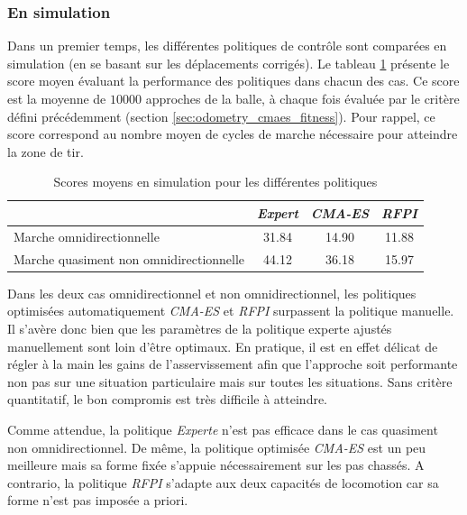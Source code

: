 \subsubsection{En simulation}

Dans un premier temps, les différentes politiques de contrôle
sont comparées en simulation (en se basant sur les déplacements corrigés).
Le tableau \ref{tab:odometry_cmaes_results_sim} présente 
le score moyen évaluant la performance des politiques dans chacun des cas.
Ce score est la moyenne de $10000$ approches
de la balle, à chaque fois évaluée par le critère défini précédemment 
(section \ref{sec:odometry_cmaes_fitness}).
Pour rappel, ce score correspond au nombre moyen de cycles de marche
nécessaire pour atteindre la zone de tir.\\

\begin{table}[h]
    \caption{
        \label{tab:odometry_cmaes_results_sim}Scores moyens 
        en simulation pour les différentes politiques}
    \centering
    \begin{tabular}{|l|c|c|c|}
        \hline
            & \textit{Expert} & \textit{CMA-ES} & \textit{RFPI} \\
        \hline
        Marche omnidirectionnelle     & 31.84      & 14.90  & 11.88      \\
        Marche quasiment non omnidirectionnelle   & 44.12      & 36.18  & 15.97 \\
        \hline
    \end{tabular}
\end{table}

Dans les deux cas omnidirectionnel et non omnidirectionnel, les politiques 
optimisées automatiquement \textit{CMA-ES} et \textit{RFPI} surpassent 
la politique manuelle.
Il s'avère donc bien que les paramètres de la politique experte 
ajustés manuellement sont loin d'être optimaux.
En pratique, il est en effet délicat de régler à la main les gains de l'asservissement 
afin que l'approche soit performante non pas sur une situation particulaire 
mais sur toutes les situations.
Sans critère quantitatif, le bon compromis est très difficile à atteindre.

Comme attendue, la politique \textit{Experte} n'est pas efficace dans le cas
quasiment non omnidirectionnel. De même, la politique optimisée \textit{CMA-ES}
est un peu meilleure mais sa forme fixée s'appuie nécessairement sur les pas chassés.
A contrario, la politique \textit{RFPI} s'adapte aux deux capacités de locomotion
car sa forme n'est pas imposée a priori.

